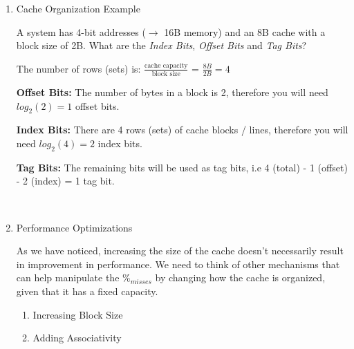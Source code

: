 \documentclass[12pt]{article}
\newenvironment{QandA}{\begin{enumerate}[label=\bfseries\arabic*.]\bfseries}
                      {\end{enumerate}}
\newenvironment{answered}{\par\quad\normalfont}{}
\begin{document}
\begin{QandA}
\begin{answered}
\textit{Example \#1:} 

If you have a simple pipeline with $CPI_{base}=1$ and 30\% of instructions are LDR and STR. If the L1 cache has $\%_{miss}=2\%$ for the Instruction Cache (I\$) and $\%_{miss}=10\%$ for the Data Cache (D\$) with a miss penalty of $t_{miss}=10$ cycles for both, what is the new $CPI_{new}$?

\begin{equation*}
    CPI_{new} = CPI_{base} + \%_{I-miss} \times t_{I-miss} + \%_{D-miss} \times t_{D-miss}
\end{equation*}
\begin{equation*}
    CPI_{new} = 1.0 + 0.02 \times 10 + 0.1 \times 10 = 1 + 0.2 + 0.3 = 1.5
\end{equation*}
\end{answered}

\item Cache Organization Example
\begin{answered}
A system has 4-bit addresses ($\rightarrow$ 16B memory) and an 8B cache with a block size of 2B. What are the \textit{Index Bits}, \textit{Offset Bits} and \textit{Tag Bits}? 

The number of rows (sets) is: $\frac{\text{cache capacity}}{\text{block size}}$ = $\frac{8B}{2B} = 4$

\textbf{Offset Bits:} The number of bytes in a block is 2, therefore you will need $log_{2}(2)=1$ offset bits.

\textbf{Index Bits:} There are 4 rows (sets) of cache blocks / lines, therefore you will need $log_{2}(4)=2$ index bits.

\textbf{Tag Bits:} The remaining bits will be used as tag bits, i.e 4 (total) - 1 (offset) - 2 (index) = 1 tag bit. 
\end{answered}

\ 

\item Performance Optimizations
\begin{answered}
As we have noticed, increasing the size of the cache doesn't necessarily result in improvement in performance. We need to think of other mechanisms that can help manipulate the $\%_{misses}$ by changing how the cache is organized, given that it has a fixed capacity.

\begin{enumerate}
    \item Increasing Block Size
    \item Adding Associativity
\end{enumerate}
\end{answered}


\end{QandA}
\end{document}
